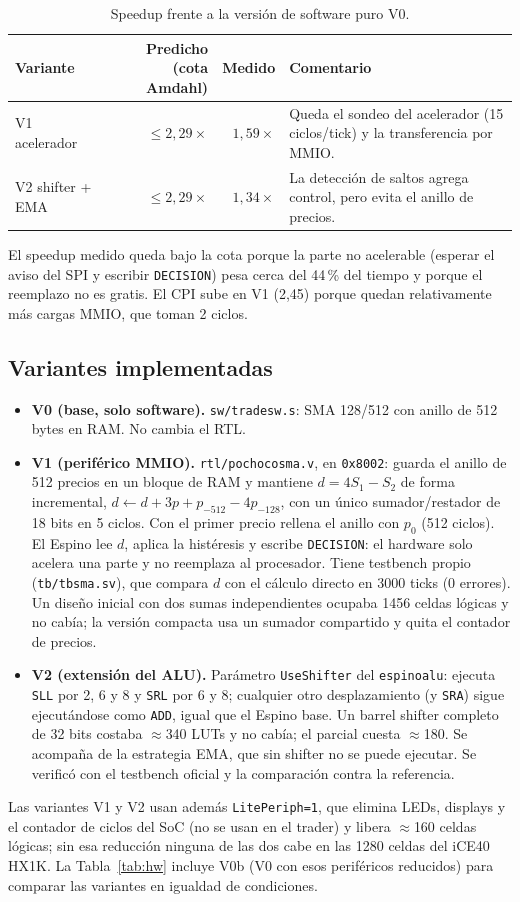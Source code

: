 \documentclass[11pt,letterpaper]{article}
\renewcommand{\_}{\textunderscore\allowbreak}
\begin{document}
\begin{table}[H]\centering\small
\caption{Speedup frente a la versión de software puro V0.}\label{tab:amdahl}
\begin{tabularx}{\linewidth}{lrrY}\toprule
Variante & Predicho (cota Amdahl) & Medido & Comentario\\\midrule
V1 acelerador & $\le 2{,}29\times$ & $1{,}59\times$ & Queda el sondeo del acelerador (15 ciclos/tick) y la transferencia por MMIO.\\
V2 shifter + EMA & $\le 2{,}29\times$ & $1{,}34\times$ & La detección de saltos agrega control, pero evita el anillo de precios.\\\bottomrule
\end{tabularx}
\end{table}
El speedup medido queda bajo la cota porque la parte no acelerable (esperar el aviso del SPI y escribir \texttt{DECISION}) pesa cerca del 44\,\% del tiempo y porque el reemplazo no es gratis. El CPI sube en V1 (2,45) porque quedan relativamente más cargas MMIO, que toman 2 ciclos.

\subsection{Variantes implementadas}
\begin{itemize}
  \item \textbf{V0 (base, solo software).} \texttt{sw/trade\_sw.s}: SMA 128/512 con anillo de 512 bytes en RAM. No cambia el RTL.
  \item \textbf{V1 (periférico MMIO).} \texttt{rtl/pochoco\_sma.v}, en \texttt{0x8002\_0000}: guarda el anillo de 512 precios en un bloque de RAM y mantiene $d=4S_1-S_2$ de forma incremental, $d\leftarrow d+3p+p_{-512}-4p_{-128}$, con un único sumador/restador de 18 bits en 5 ciclos. Con el primer precio rellena el anillo con $p_0$ (512 ciclos). El Espino lee $d$, aplica la histéresis y escribe \texttt{DECISION}: el hardware solo acelera una parte y no reemplaza al procesador. Tiene testbench propio (\texttt{tb/tb\_sma.sv}), que compara $d$ con el cálculo directo en 3000 ticks (0 errores). Un diseño inicial con dos sumas independientes ocupaba 1456 celdas lógicas y no cabía; la versión compacta usa un sumador compartido y quita el contador de precios.
  \item \textbf{V2 (extensión del ALU).} Parámetro \texttt{UseShifter} del \texttt{espino\_alu}: ejecuta \texttt{SLL} por 2, 6 y 8 y \texttt{SRL} por 6 y 8; cualquier otro desplazamiento (y \texttt{SRA}) sigue ejecutándose como \texttt{ADD}, igual que el Espino base. Un barrel shifter completo de 32 bits costaba $\approx$340 LUTs y no cabía; el parcial cuesta $\approx$180. Se acompaña de la estrategia EMA, que sin shifter no se puede ejecutar. Se verificó con el testbench oficial y la comparación contra la referencia.
\end{itemize}
Las variantes V1 y V2 usan además \texttt{LitePeriph=1}, que elimina LEDs, displays y el contador de ciclos del SoC (no se usan en el trader) y libera $\approx$160 celdas lógicas; sin esa reducción ninguna de las dos cabe en las 1280 celdas del iCE40 HX1K. La Tabla~\ref{tab:hw} incluye V0b (V0 con esos periféricos reducidos) para comparar las variantes en igualdad de condiciones.
\end{document}
